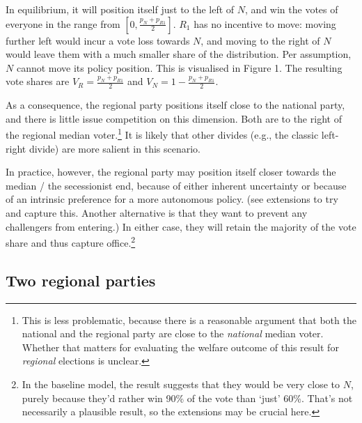 \documentclass[11pt]{article}
\begin{document}
 In equilibrium, it will position itself just to the left of $N$, and win the votes of everyone in the range from $[0, \frac{p_N + p_{R1}}{2}]$. $R_1$ has no incentive to move: moving further left would incur a vote loss towards $N$, and moving to the right of $N$ would leave them with a much smaller share of the distribution. Per assumption, $N$ cannot move its policy position. This is visualised in Figure 1. The resulting vote shares are $V_R = \frac{p_N + p_{R1}}{2}$ and $V_N = 1 - \frac{p_N + p_{R1}}{2}$.

As a consequence, the regional party positions itself close to the national party, and there is little issue competition on this dimension. Both are to the right of the regional median voter.\footnote{This is less problematic, because there is a reasonable argument that both the national and the regional party are close to the \textit{national} median voter. Whether that matters for evaluating the welfare outcome of this result for \textit{regional} elections is unclear.} It is likely that other divides (e.g., the classic left-right divide) are more salient in this scenario.

In practice, however, the regional party may position itself closer towards the median / the secessionist end, because of either inherent uncertainty or because of an intrinsic preference for a more autonomous policy. (see extensions to try and capture this. Another alternative is that they want to prevent any challengers from entering.) In either case, they will retain the majority of the vote share and thus capture office.\footnote{In the baseline model, the result suggests that they would be very close to $N$, purely because they'd rather win 90\% of the vote than `just' 60\%. That's not necessarily a plausible result, so the extensions may be crucial here.}

\subsection{Two regional parties}
\end{document}
